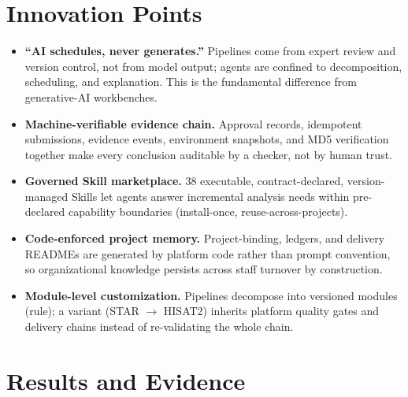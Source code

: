 \documentclass[11pt,a4paper]{article}
\begin{document}
\section{Innovation Points}

\begin{itemize}
  \item \textbf{``AI schedules, never generates.''} Pipelines come from expert review and version control, not from model output; agents are confined to decomposition, scheduling, and explanation. This is the fundamental difference from generative-AI workbenches.
  \item \textbf{Machine-verifiable evidence chain.} Approval records, idempotent submissions, evidence events, environment snapshots, and MD5 verification together make every conclusion auditable by a checker, not by human trust.
  \item \textbf{Governed Skill marketplace.} 38 executable, contract-declared, version-managed Skills let agents answer incremental analysis needs within pre-declared capability boundaries (install-once, reuse-across-projects).
  \item \textbf{Code-enforced project memory.} Project-binding, ledgers, and delivery READMEs are generated by platform code rather than prompt convention, so organizational knowledge persists across staff turnover by construction.
  \item \textbf{Module-level customization.} Pipelines decompose into versioned modules (rule); a variant (STAR $\rightarrow$ HISAT2) inherits platform quality gates and delivery chains instead of re-validating the whole chain.
\end{itemize}

\section{Results and Evidence}
\end{document}
